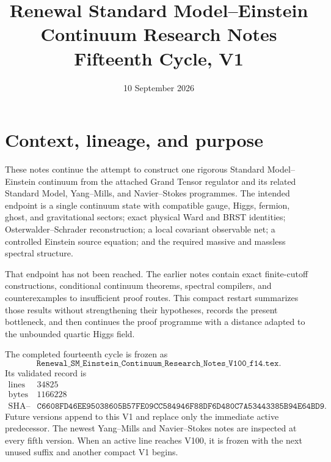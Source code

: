 \documentclass[11pt]{article}
\title{Renewal Standard Model--Einstein Continuum Research Notes\\
Fifteenth Cycle, V1}
\author{}
\date{10 September 2026}
\theoremstyle{remark}
\begin{document}
\maketitle
\tableofcontents

\section{Context, lineage, and purpose}
\label{sec:v15v1}

These notes continue the attempt to construct one rigorous
Standard Model--Einstein continuum from the attached Grand Tensor
regulator and its related Standard Model, Yang--Mills, and
Navier--Stokes programmes.  The intended endpoint is a single
continuum state with compatible gauge, Higgs, fermion, ghost, and
gravitational sectors; exact physical Ward and BRST identities;
Osterwalder--Schrader reconstruction; a local covariant observable
net; a controlled Einstein source equation; and the required
massive and massless spectral structure.

That endpoint has not been reached.  The earlier notes contain
exact finite-cutoff constructions, conditional continuum theorems,
spectral compilers, and counterexamples to insufficient proof
routes.  This compact restart summarizes those results without
strengthening their hypotheses, records the present bottleneck,
and then continues the proof programme with a distance adapted to
the unbounded quartic Higgs field.

The completed fourteenth cycle is frozen as
\[
 \texttt{Renewal\_SM\_Einstein\_Continuum\_Research\_Notes\_V100\_f14.tex}.
                                                                  \tag{1.1}
\]
Its validated record is
\[
\begin{array}{c|c}
 \text{lines}&34825\\
 \text{bytes}&1166228\\
 \text{SHA--256}&
 \texttt{C6608FD46EE95038605B57FE09CC584946F88DF6D480C7A53443385B94E64BD9}.
\end{array}                                                       \tag{1.2}
\]
Future versions append to this V1 and replace only the immediate
active predecessor.  The newest Yang--Mills and Navier--Stokes
notes are inspected at every fifth version.  When an active line
reaches V100, it is frozen with the next unused suffix and another
compact V1 begins.
\end{document}

